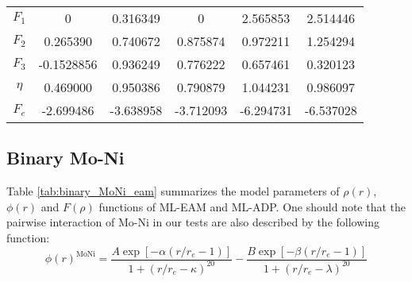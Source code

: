 \documentclass[prb,preprint]{revtex4-2}
\begin{document}
\begin{table}
{\begin{tabular}{cccccc}
$F_{1}$      & 0          & 0.316349   & 0          & 2.565853   & 2.514446   \\
$F_{2}$      & 0.265390   & 0.740672   & 0.875874   & 0.972211   & 1.254294   \\
$F_{3}$      & -0.1528856 & 0.936249   & 0.776222   & 0.657461   & 0.320123   \\
$\eta$       & 0.469000   & 0.950386   & 0.790879   & 1.044231   & 0.986097   \\
$F_{e}$      & -2.699486  & -3.638958  & -3.712093  & -6.294731  & -6.537028  \\
\bottomrule
\end{tabular}
}
\label{tab:elementary_Ni_Mo_eam}
\end{table}

% 
%
\begin{table}
\caption{
Model parameters of the $\mu(r)$ and $\omega(r)$ functions of the elementary Mo 
ML-ADP.
}
\label{tab:elementary_Mo_adp}
\end{table}

% 
%
\subsection{Binary Mo-Ni}
\label{sec:binary}

Table \ref{tab:binary_MoNi_eam} summarizes the model parameters of $\rho(r)$, 
$\phi(r)$ and $F(\rho)$ functions of ML-EAM and ML-ADP. One should note that
the pairwise interaction of Mo-Ni in our tests are also described by the 
following function:
\begin{equation}
\phi(r)^{\mathrm{MoNi}} = 
\frac{A \exp\left[ -\alpha\left( r/r_{e} - 1 \right) \right]}
{1 + \left(r / r_{e} - \kappa\right)^{20}} - 
\frac{B \exp\left[ -\beta\left( r/r_{e} - 1 \right) \right]}
{1 + \left(r / r_{e} - \lambda\right)^{20}}
\end{equation}
\end{document}
